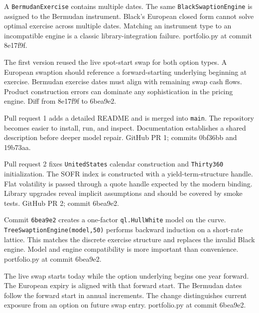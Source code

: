 {A \texttt{BermudanExercise} contains multiple dates.}
{The same \texttt{BlackSwaptionEngine} is assigned to the Bermudan instrument.}
{Black's European closed form cannot solve optimal exercise across multiple dates.}
{Matching an instrument type to an incompatible engine is a classic library-integration failure.}
{portfolio.py at commit 8e17f9f.}

{The first version reused the live spot-start swap for both option types.}
{A European swaption should reference a forward-starting underlying beginning at exercise.}
{Bermudan exercise dates must align with remaining swap cash flows.}
{Product construction errors can dominate any sophistication in the pricing engine.}
{Diff from 8e17f9f to 6bea9e2.}

{Pull request 1 adds a detailed README and is merged into \texttt{main}.}
{The repository becomes easier to install, run, and inspect.}
{Documentation establishes a shared description before deeper model repair.}
{GitHub PR 1; commits 0bf36bb and 19b73aa.}

{Pull request 2 fixes \texttt{UnitedStates} calendar construction and \texttt{Thirty360} initialization.}
{The SOFR index is constructed with a yield-term-structure handle.}
{Flat volatility is passed through a quote handle expected by the modern binding.}
{Library upgrades reveal implicit assumptions and should be covered by smoke tests.}
{GitHub PR 2; commit 6bea9e2.}

{Commit \texttt{6bea9e2} creates a one-factor \texttt{ql.HullWhite} model on the curve.}
{\texttt{TreeSwaptionEngine(model,50)} performs backward induction on a short-rate lattice.}
{This matches the discrete exercise structure and replaces the invalid Black engine.}
{Model and engine compatibility is more important than convenience.}
{portfolio.py at commit 6bea9e2.}

{The live swap starts today while the option underlying begins one year forward.}
{The European expiry is aligned with that forward start.}
{The Bermudan dates follow the forward start in annual increments.}
{The change distinguishes current exposure from an option on future swap entry.}
{portfolio.py at commit 6bea9e2.}

